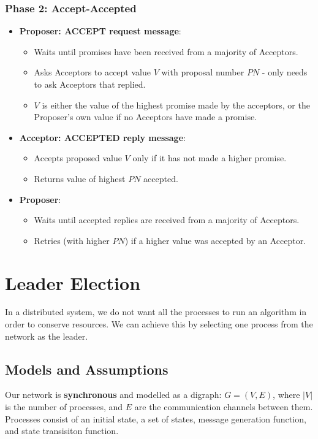 \documentclass[11pt]{article}
\begin{document}
\subsubsection{Phase 2: Accept-Accepted}
\begin{itemize}
  \item \textbf{Proposer: ACCEPT request message}:
    \begin{itemize}
      \item Waits until promises have been received from a majority of Acceptors.
      \item Asks Acceptors to accept value $V$ with proposal number $PN$ - only needs to ask Acceptors that replied.
      \item $V$ is either the value of the highest promise made by the acceptors, or the Proposer's  own value if no Acceptors have made a promise.
    \end{itemize}
  \item \textbf{Acceptor: ACCEPTED reply message}:
    \begin{itemize}
      \item Accepts proposed value $V$ only if it has not made a higher promise.
      \item Returns value of highest $PN$ accepted.
    \end{itemize}
  \item \textbf{Proposer}:
    \begin{itemize}
      \item Waits until accepted replies are received from a majority of Acceptors.
      \item Retries (with higher $PN$) if a higher value was accepted by an Acceptor.
    \end{itemize}
\end{itemize}

\section{Leader Election}
In a distributed system, we do not want all the processes to run an algorithm in order to conserve resources.
We can achieve this by selecting one process from the network as the leader.

\subsection{Models and Assumptions}
Our network is \textbf{synchronous} and modelled as a digraph: $G = (V, E)$, where $\lvert V \rvert$ is the number of processes, and $E$ are the communication channels between them.
Processes consist of an initial state, a set of states, message generation function, and state transisiton function.
\end{document}
